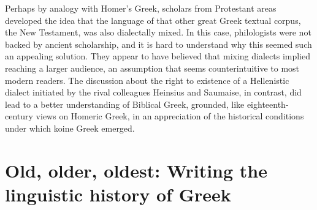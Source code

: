 Perhaps by analogy with Homer’s Greek, scholars from Protestant areas developed the idea that the language of that other great Greek textual corpus, the New Testament, was also dialectally mixed. In this case, philologists were not backed by ancient scholarship, and it is hard to understand why this seemed such an appealing solution. They appear to have believed that mixing dialects implied reaching a larger audience, an assumption that seems counterintuitive to most modern readers. The discussion about the right to existence of a Hellenistic dialect initiated by the rival colleagues Heinsius and Saumaise, in contrast, did lead to a better understanding of Biblical Greek, grounded, like eighteenth-century views on Homeric Greek, in an appreciation of the historical conditions under which koine Greek emerged.

\chapter{Old, older, oldest: Writing the linguistic history of Greek}

